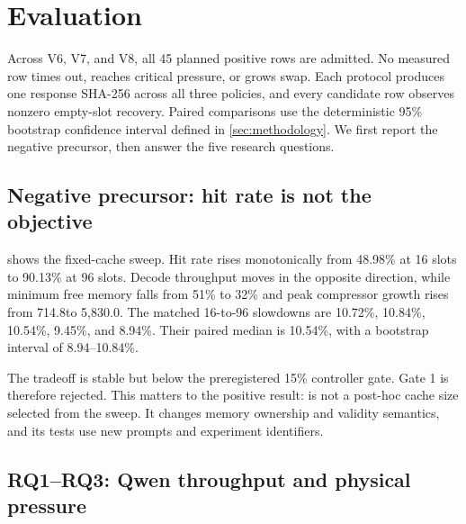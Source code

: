 \section{Evaluation}
\label{sec:evaluation}

Across V6, V7, and V8, all 45 planned positive rows are admitted. No measured
row times out, reaches critical pressure, or grows swap. Each protocol produces
one response SHA-256 across all three policies, and every candidate row observes
nonzero empty-slot recovery. Paired comparisons use the deterministic 95\%
bootstrap confidence interval defined in \cref{sec:methodology}. We first report the negative precursor, then answer
the five research questions.

\subsection{Negative precursor: hit rate is not the objective}

 shows the fixed-cache sweep. Hit rate rises monotonically from
48.98\% at 16 slots to 90.13\% at 96 slots. Decode throughput moves in the
opposite direction, while minimum free memory falls from 51\% to 32\% and peak
compressor growth rises from 714.8\mib to 5,830.0\mib. The matched 16-to-96
slowdowns are 10.72\%, 10.84\%, 10.54\%, 9.45\%, and 8.94\%. Their paired
median is 10.54\%, with a bootstrap interval of 8.94--10.84\%.

The tradeoff is stable but below the preregistered 15\% controller gate. Gate 1
is therefore rejected. This matters to the positive result: \system is not a
post-hoc cache size selected from the sweep. It changes memory ownership and
validity semantics, and its tests use new prompts and experiment identifiers.

\subsection{RQ1--RQ3: Qwen throughput and physical pressure}


